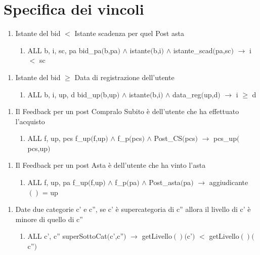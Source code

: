 \documentclass{article}
\begin{document}
\newpage
\section{\label{sec:SpecificaVincoli}Specifica dei vincoli}

\begin{enumerate}
    \item Istante del bid $<$ Istante scadenza per quel Post asta
    \begin{enumerate}
        \item ALL b, i, sc, pa bid\_pa$($b,pa$)$ $\land$ istante$($b,i$)$ $\land$ istante\_scad$($pa,sc$)$ $\rightarrow$ i $<$ sc
    \end{enumerate}
\end{enumerate}

\begin{enumerate}
    \item Istante del bid $\geq$ Data di registrazione dell'utente
    \begin{enumerate}
        \item ALL b, i, up, d bid\_up$($b,up$)$ $\land$ istante$($b,i$)$ $\land$ data\_reg$($up,d$)$ $\rightarrow$ i $\geq$ d
    \end{enumerate}
\end{enumerate}

\begin{enumerate}
    \item Il Feedback per un post Compralo Subito è dell'utente che ha effettuato l'acquisto
    \begin{enumerate}
        \item ALL f, up, pcs f\_up$($f,up$)$ $\land$ f\_p$($pcs$)$ $\land$ Post\_CS$($pcs$)$ $\rightarrow$ pcs\_up$($pcs,up$)$
    \end{enumerate}
\end{enumerate}

\begin{enumerate}
    \item Il Feedback per un post Asta è dell'utente che ha vinto l'asta
    \begin{enumerate}
        \item ALL f, up, pa f\_up$($f,up$)$ $\land$ f\_p$($pa$)$ $\land$ Post\_asta$($pa$)$ $\rightarrow$ aggiudicante$()$ = up
    \end{enumerate}
\end{enumerate}

\begin{enumerate}
    \item Date due categorie c' e c'', se c' è supercategoria di c'' allora il livello di c' è minore di quello di c''
    \begin{enumerate}
        \item ALL c', c'' superSottoCat$($c',c''$)$ $\rightarrow$ getLivello$()($c'$)$ $<$ getLivello$()($c''$)$
    \end{enumerate}
\end{enumerate}
\end{document}
